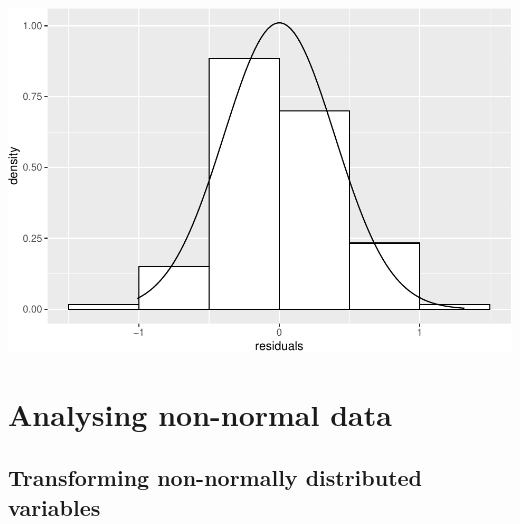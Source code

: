 \documentclass[
]{memoir}
\newenvironment{Shaded}{\begin{snugshade}}{\end{snugshade}}
\newcommand{\AttributeTok}[1]{\textcolor[rgb]{0.77,0.63,0.00}{#1}}
\newcommand{\FloatTok}[1]{\textcolor[rgb]{0.00,0.00,0.81}{#1}}
\newcommand{\FunctionTok}[1]{\textcolor[rgb]{0.00,0.00,0.00}{#1}}
\newcommand{\NormalTok}[1]{#1}
\newcommand{\SpecialCharTok}[1]{\textcolor[rgb]{0.00,0.00,0.00}{#1}}
\newcommand{\StringTok}[1]{\textcolor[rgb]{0.31,0.60,0.02}{#1}}
\begin{document}
\begin{Shaded}
\end{Shaded}

\includegraphics{08.1-correlation-regression-R_files/figure-latex/unnamed-chunk-12-2.pdf}

\hypertarget{analysing-non-normal-data}{%
\chapter{Analysing non-normal data}\label{analysing-non-normal-data}}

\hypertarget{transforming-non-normally-distributed-variables}{%
\section{Transforming non-normally distributed variables}\label{transforming-non-normally-distributed-variables}}
\end{document}
